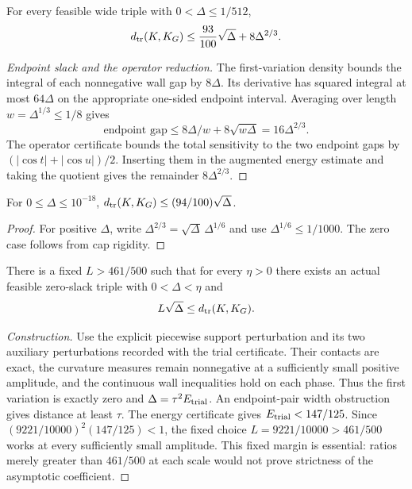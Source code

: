 \begin{theorem}
\label{thm:quant-full-q}
For every feasible wide triple with $0<\Delta\le1/512$,
\[
 d_{\rm tr}(K,K_G)
 \le\frac{93}{100}\sqrt\Delta+8\Delta^{2/3}.
\]
\end{theorem}
\begin{proof}[Endpoint slack and the operator reduction]
The first-variation density bounds the integral of each nonnegative wall gap
by $8\Delta$. Its derivative has squared integral at most $64\Delta$ on
the appropriate one-sided endpoint interval. Averaging over length
$w=\Delta^{1/3}\le1/8$ gives
\[
 \text{endpoint gap}\le 8\Delta/w+8\sqrt{w\Delta}
                       =16\Delta^{2/3}.
\]
The operator certificate bounds the total sensitivity to the two endpoint
gaps by $(|\cos t|+|\cos u|)/2$. Inserting them in the augmented energy
estimate and taking the quotient gives the remainder $8\Delta^{2/3}$.
\end{proof}

\begin{corollary}\label{cor:quant-full-q-094}
For $0\le\Delta\le10^{-18}$,
$d_{\rm tr}(K,K_G)\le(94/100)\sqrt\Delta$.
\end{corollary}
\begin{proof}
For positive $\Delta$, write
$\Delta^{2/3}=\sqrt\Delta\,\Delta^{1/6}$ and use
$\Delta^{1/6}\le1/1000$. The zero case follows from cap rigidity.
\end{proof}

\begin{theorem}
\label{thm:quant-critical-lower}
There is a fixed $L>461/500$ such that for every $\eta>0$ there exists
an actual feasible zero-slack triple with $0<\Delta<\eta$ and
\[
 L\sqrt\Delta\le d_{\rm tr}(K,K_G).
\]
\end{theorem}
\begin{proof}[Construction]
Use the explicit piecewise support perturbation and its two auxiliary
perturbations recorded with the trial certificate. Their contacts are exact,
the curvature measures remain nonnegative at a sufficiently small positive
amplitude, and the continuous wall inequalities hold on each phase. Thus the
first variation is exactly zero and $\Delta=\tau^2E_{\rm trial}$.
An endpoint-pair width obstruction gives distance at least $\tau$.
The energy certificate gives $E_{\rm trial}<147/125$.
Since
$(9221/10000)^2(147/125)<1$, the fixed choice
$L=9221/10000>461/500$ works at every sufficiently small amplitude.
This fixed margin is essential: ratios merely greater than $461/500$ at
each scale would not prove strictness of the asymptotic coefficient.
\end{proof}

